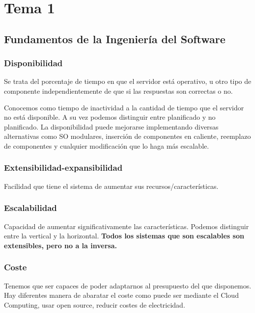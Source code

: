 \section{Tema 1}

\subsection{Fundamentos de la Ingeniería del Software}


\subsubsection{Disponibilidad}

Se trata del porcentaje de tiempo en que el servidor está operativo, u otro tipo de componente independientemente de que si las respuestas son correctas o no.

Conocemos como tiempo de inactividad a la cantidad de tiempo que el servidor no está disponible. A su vez podemos distinguir entre planificado y no planificado. La disponibilidad puede mejorarse implementando diversas alternativas como SO modulares, inserción de componentes en caliente, reemplazo de componentes y cualquier modificación que lo haga más escalable.

\subsubsection{Extensibilidad-expansibilidad}

Facilidad que tiene el sistema de aumentar sus recursos/características.

\subsubsection{Escalabilidad}

Capacidad de aumentar significativamente las características. Podemos distinguir entre la vertical y la horizontal. \textbf{Todos los sistemas que son escalables son extensibles, pero no a la inversa.}

\subsubsection{Coste}

Tenemos que ser capaces de poder adaptarnos al presupuesto del que disponemos. Hay diferentes manera de abaratar el coste como puede ser mediante el Cloud Computing, usar open source, reducir costes de electricidad.

